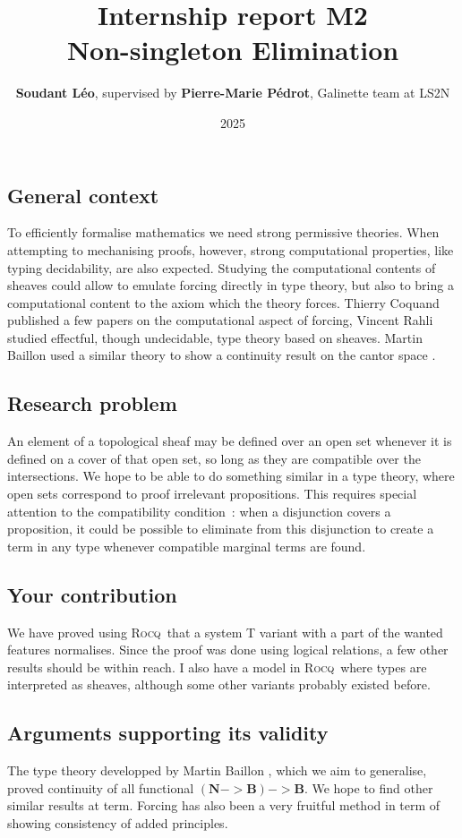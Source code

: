 \documentclass[11pt]{article}
\title{Internship report M2\\  Non-singleton Elimination\\}
\author{\textbf{Soudant L\'eo}, supervised by \textbf{Pierre-Marie P\'edrot}, Galinette team at LS2N}
\date{2025}
\newcommand{\0}{\mathbf{0}}
\newcommand{\1}{\mathbf{1}}
\newcommand{\nat}{\mathbf{N}}
\newcommand{\bool}{\mathbf{B}}
\newcommand{\rocq}{\textsc{Rocq}}
\begin{document}
\maketitle
\newpage


\subsection*{General context}
To efficiently formalise mathematics we need strong permissive theories.
When attempting to mechanising proofs, however, strong computational properties, like typing decidability, are also expected.
Studying the computational contents of sheaves could allow to emulate forcing directly in type theory, but also to bring a computational content to the axiom which the theory forces.
Thierry Coquand published a few papers on the computational aspect of forcing, Vincent Rahli studied effectful, though undecidable, type theory based on sheaves.
Martin Baillon used a similar theory to show a continuity result on the cantor space \cite{baillon:tel-04617881}.
\subsection*{Research problem}
An element of a topological sheaf may be defined over an open set whenever it is defined on a cover of that open set, so long as they are compatible over the intersections.
We hope to be able to do something similar in a type theory, where open sets correspond to proof irrelevant propositions.
This requires special attention to the compatibility condition~: when a disjunction covers a proposition, it could be possible to eliminate from this disjunction to create a term in any type whenever compatible marginal terms are found.
\subsection*{Your contribution}
We have proved using \rocq\ that a system T variant with a part of the wanted features normalises. Since the proof was done using logical relations, a few other results should be within reach. I also have a model in \rocq\ where types are interpreted as sheaves, although some other variants probably existed before.
\subsection*{Arguments supporting its validity}
The type theory developped by Martin Baillon \cite{baillon:tel-04617881}, which we aim to generalise, proved continuity of all functional $(\nat -> \bool) -> \bool$.
We hope to find other similar results at term.
Forcing has also been a very fruitful method in term of showing consistency of added principles.
\end{document}
